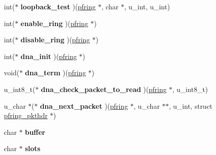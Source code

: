 \begin{DoxyCompactItemize}
\item 
\hypertarget{struct____pfring_a969aa5320e1272c375f941aa772b68b2}{
int($\ast$ {\bfseries loopback\_\-test} )(\hyperlink{struct____pfring}{pfring} $\ast$, char $\ast$, u\_\-int, u\_\-int)}
\label{struct____pfring_a969aa5320e1272c375f941aa772b68b2}

\item 
\hypertarget{struct____pfring_a26cd0c37a7af1f93635bc582d2e9f4df}{
int($\ast$ {\bfseries enable\_\-ring} )(\hyperlink{struct____pfring}{pfring} $\ast$)}
\label{struct____pfring_a26cd0c37a7af1f93635bc582d2e9f4df}

\item 
\hypertarget{struct____pfring_ad31a5951f7b10f02a18c74a58ee832a7}{
int($\ast$ {\bfseries disable\_\-ring} )(\hyperlink{struct____pfring}{pfring} $\ast$)}
\label{struct____pfring_ad31a5951f7b10f02a18c74a58ee832a7}

\item 
\hypertarget{struct____pfring_a7ec606154a0468422a37ffa59430c163}{
int($\ast$ {\bfseries dna\_\-init} )(\hyperlink{struct____pfring}{pfring} $\ast$)}
\label{struct____pfring_a7ec606154a0468422a37ffa59430c163}

\item 
\hypertarget{struct____pfring_a6539f0d2cbe431ea1fce7151eafdf804}{
void($\ast$ {\bfseries dna\_\-term} )(\hyperlink{struct____pfring}{pfring} $\ast$)}
\label{struct____pfring_a6539f0d2cbe431ea1fce7151eafdf804}

\item 
\hypertarget{struct____pfring_ae0f86a49d2563a9e9a6e8f19fbe25ba9}{
u\_\-int8\_\-t($\ast$ {\bfseries dna\_\-check\_\-packet\_\-to\_\-read} )(\hyperlink{struct____pfring}{pfring} $\ast$, u\_\-int8\_\-t)}
\label{struct____pfring_ae0f86a49d2563a9e9a6e8f19fbe25ba9}

\item 
\hypertarget{struct____pfring_a12dcf1a97ce102075f7c51eefa08b45d}{
u\_\-char $\ast$($\ast$ {\bfseries dna\_\-next\_\-packet} )(\hyperlink{struct____pfring}{pfring} $\ast$, u\_\-char $\ast$$\ast$, u\_\-int, struct \hyperlink{structpfring__pkthdr}{pfring\_\-pkthdr} $\ast$)}
\label{struct____pfring_a12dcf1a97ce102075f7c51eefa08b45d}

\item 
\hypertarget{struct____pfring_aceace4ee726009f80f64f54076cd9543}{
char $\ast$ {\bfseries buffer}}
\label{struct____pfring_aceace4ee726009f80f64f54076cd9543}

\item 
\hypertarget{struct____pfring_a433aaa87147cbeb607d82d24ccf82a87}{
char $\ast$ {\bfseries slots}}
\label{struct____pfring_a433aaa87147cbeb607d82d24ccf82a87}


\end{DoxyCompactItemize}
